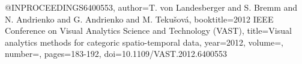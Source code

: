 @INPROCEEDINGS{6400553,
  author={T. {von Landesberger} and S. {Bremm} and N. {Andrienko} and G. {Andrienko} and M. {Tekušová}},
  booktitle={2012 IEEE Conference on Visual Analytics Science and Technology (VAST)}, 
  title={Visual analytics methods for categoric spatio-temporal data}, 
  year={2012},
  volume={},
  number={},
  pages={183-192},
  doi={10.1109/VAST.2012.6400553}}